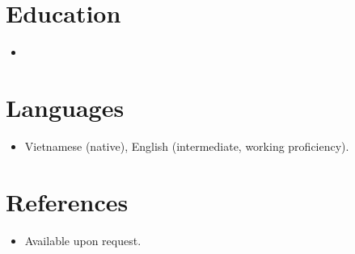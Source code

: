 \documentclass[11pt,a4paper,sans]{moderncv}
\begin{document}

\section{Education}
\vspace{1pt}
\begin{itemize}
\item{}
\end{itemize}


\section{Languages}
\vspace{1pt}
\begin{itemize}
\item {Vietnamese (native), English (intermediate, working proficiency).}
\end{itemize}


\section{References}
\vspace{1pt}
\begin{itemize}
\item{Available upon request.}
\end{itemize}
\end{document}
